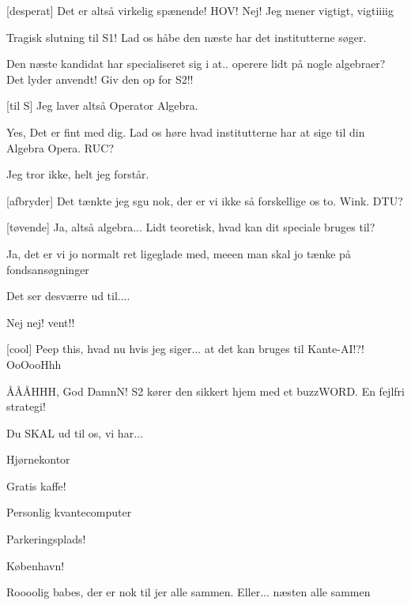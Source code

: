 \documentclass[a4paper,11pt]{article}
\begin{document}
\begin{sketch}
[desperat] Det er altså virkelig spænende! HOV!  Nej! Jeg mener vigtigt, vigtiiiig 


 Tragisk slutning til S1! Lad os håbe den næste har det institutterne søger. 


 Den næste kandidat har specialiseret sig i at.. operere lidt på nogle algebraer? Det lyder anvendt! Giv den op for S2!!


[til S] Jeg laver altså Operator Algebra.

 Yes, Det er fint med dig. Lad os høre hvad institutterne har at sige til din Algebra Opera. RUC?

 Jeg tror ikke, helt jeg forstår. 

[afbryder] Det tænkte jeg sgu nok, der er vi ikke så forskellige os to. Wink. DTU?

[tøvende] Ja, altså algebra... Lidt teoretisk, hvad kan dit speciale bruges til? 

 Ja, det er vi jo normalt ret ligeglade med, meeen man skal jo tænke på fondsansøgninger

 Det ser desværre ud til....


 Nej nej! vent!! 

[cool] Peep this, hvad nu hvis jeg siger... at det kan bruges til Kante-AI!?! OoOooHhh

 ÅÅÅHHH, God DamnN! S2 kører den sikkert hjem med et buzzWORD. En fejlfri strategi!


 Du SKAL ud til os, vi har...

 Hjørnekontor

 Gratis kaffe!

 Personlig kvantecomputer

 Parkeringsplads!

 København!


 Roooolig babes, der er nok til jer alle sammen. Eller... næsten alle sammen


\end{sketch}
\end{document}
